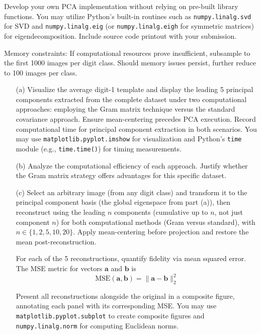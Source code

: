\documentclass[11pt,addpoints,answers]{exam}
\begin{document}
\begin{enumerate}
		Develop your own PCA implementation without relying on pre-built library functions. You may utilize Python's built-in routines such as \texttt{numpy.linalg.svd} for SVD and \texttt{numpy.linalg.eig} (or \texttt{numpy.linalg.eigh} for symmetric matrices) for eigendecomposition. Include source code printout with your submission.
		
		Memory constraints: If computational resources prove insufficient, subsample to the first 1000 images per digit class. Should memory issues persist, further reduce to 100 images per class.
		
		
		\begin{enumerate}
			\item[(a)] Visualize the average digit-1 template and display the leading 5 principal components extracted from the complete dataset under two computational approaches: employing the Gram matrix technique versus the standard covariance approach.  
			Ensure mean-centering precedes PCA execution. Record computational time for principal component extraction in both scenarios. You may use \texttt{matplotlib.pyplot.imshow} for visualization and Python's \texttt{time} module (e.g., \texttt{time.time()}) for timing measurements.
			
			\item[(b)] Analyze the computational efficiency of each approach. Justify whether the Gram matrix strategy offers advantages for this specific dataset.
			
			\item[(c)] Select an arbitrary image (from any digit class) and transform it to the principal component basis (the global eigenspace from part (a)), then reconstruct using the leading $n$ components (cumulative up to $n$, not just component $n$) for both computational methods (Gram versus standard), with $n \in \{1, 2, 5, 10, 20\}$. Apply mean-centering before projection and restore the mean post-reconstruction.
			
			For each of the 5 reconstructions, quantify fidelity via mean squared error. The MSE metric for vectors $\mathbf{a}$ and $\mathbf{b}$ is 
			\[
			\text{MSE}(\mathbf{a}, \mathbf{b}) = \|\mathbf{a} - \mathbf{b}\|_{2}^{2}
			\]
			
			Present all reconstructions alongside the original in a composite figure, annotating each panel with its corresponding MSE. You may use \texttt{matplotlib.pyplot.subplot} to create composite figures and \texttt{numpy.linalg.norm} for computing Euclidean norms.
		\end{enumerate}
		
	\end{enumerate}
	
	\clearpage
	
	
\end{document}
